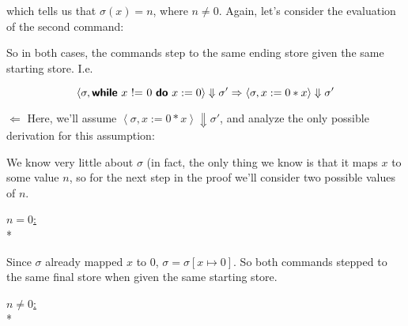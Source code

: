 \documentclass[11pt]{article}
\begin{document}
\begin{exercise}
\begin{enumerate}
which tells us that $\sigma(x) = n$, where $n \neq 0$. Again, let's consider the evaluation of the second command:

\begin{prooftree}
\end{prooftree}

So in both cases, the commands step to the same ending store given the same starting store. I.e.

$$\left< \sigma, \while{x~\mathord{!}\mathord{=}~0}{x := 0} \right> \Downarrow \sigma' \Rightarrow \left< \sigma, x:= 0 * x \right> \Downarrow \sigma'$$


$\Leftarrow$
Here, we'll assume $\left < \sigma, x:=0 * x \right> \Downarrow \sigma'$, and analyze the only possible derivation for this assumption:

\begin{prooftree}
\end{prooftree}

We know very little about $\sigma$ (in fact, the only thing we know is that it maps $x$ to some value $n$, so for the next step in the proof we'll consider two possible values of $n$.

\underline{$n = 0$:}\\*

\begin{prooftree}
\end{prooftree}

Since $\sigma$ already mapped $x$ to 0, $\sigma = \sigma[x \mapsto 0]$. So both commands stepped to the same final store when given the same starting store.

\underline{$n \neq 0$:}\\*


\end{enumerate}
\end{exercise}
\end{document}

